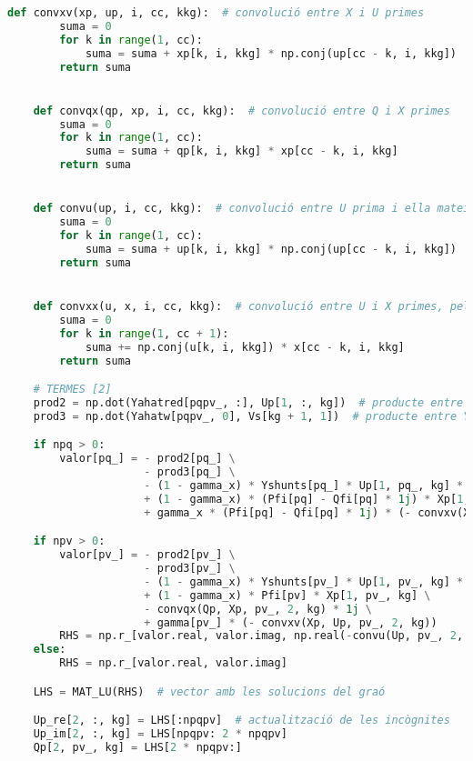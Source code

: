\begin{lstlisting}[language=Python,numbers=none]
    def convxv(xp, up, i, cc, kkg):  # convolució entre X i U primes
        suma = 0
        for k in range(1, cc):
            suma = suma + xp[k, i, kkg] * np.conj(up[cc - k, i, kkg])
        return suma


    def convqx(qp, xp, i, cc, kkg):  # convolució entre Q i X primes
        suma = 0
        for k in range(1, cc):
            suma = suma + qp[k, i, kkg] * xp[cc - k, i, kkg]
        return suma


    def convu(up, i, cc, kkg):  # convolució entre U prima i ella mateixa
        suma = 0
        for k in range(1, cc):
            suma = suma + up[k, i, kkg] * np.conj(up[cc - k, i, kkg])
        return suma


    def convxx(u, x, i, cc, kkg):  # convolució entre U i X primes, pel càlcul de les Xp
        suma = 0
        for k in range(1, cc + 1):
            suma += np.conj(u[k, i, kkg]) * x[cc - k, i, kkg]
        return suma

    # TERMES [2]
    prod2 = np.dot(Yahatred[pqpv_, :], Up[1, :, kg])  # producte entre reduïda on files no sumen 0 i tensions dels PQ i PV
    prod3 = np.dot(Yahatw[pqpv_, 0], Vs[kg + 1, 1])  # producte entre Ya de l'oscil·lant i tensió d'aquest

    if npq > 0:
        valor[pq_] = - prod2[pq_] \
                     - prod3[pq_] \
                     - (1 - gamma_x) * Yshunts[pq_] * Up[1, pq_, kg] * np.prod(abs(Us0[pq, :kg + 1]), axis=1) ** 2 \
                     + (1 - gamma_x) * (Pfi[pq] - Qfi[pq] * 1j) * Xp[1, pq_, kg] \
                     + gamma_x * (Pfi[pq] - Qfi[pq] * 1j) * (- convxv(Xp, Up, pq_, 2, kg))

    if npv > 0:
        valor[pv_] = - prod2[pv_] \
                     - prod3[pv_] \
                     - (1 - gamma_x) * Yshunts[pv_] * Up[1, pv_, kg] * np.prod(abs(Us0[pv, :kg + 1]), axis=1) ** 2 \
                     + (1 - gamma_x) * Pfi[pv] * Xp[1, pv_, kg] \
                     - convqx(Qp, Xp, pv_, 2, kg) * 1j \
                     + gamma[pv_] * (- convxv(Xp, Up, pv_, 2, kg))
        RHS = np.r_[valor.real, valor.imag, np.real(-convu(Up, pv_, 2, kg))]  # vector de la dreta del sistema d'equacions
    else:
        RHS = np.r_[valor.real, valor.imag]

    LHS = MAT_LU(RHS)  # vector amb les solucions del graó

    Up_re[2, :, kg] = LHS[:npqpv]  # actualització de les incògnites
    Up_im[2, :, kg] = LHS[npqpv: 2 * npqpv]
    Qp[2, pv_, kg] = LHS[2 * npqpv:]


\end{lstlisting}
